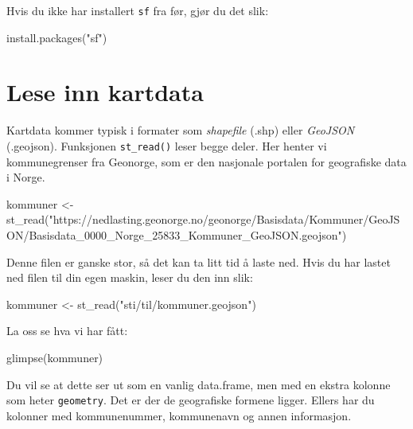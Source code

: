 \documentclass[
  norsk,
  letterpaper,
  DIV=11,
  numbers=noendperiod]{scrreprt}
\newenvironment{Shaded}{\begin{snugshade}}{\end{snugshade}}
\newcommand{\FunctionTok}[1]{\textcolor[rgb]{0.28,0.35,0.67}{#1}}
\newcommand{\NormalTok}[1]{\textcolor[rgb]{0.00,0.23,0.31}{#1}}
\newcommand{\OtherTok}[1]{\textcolor[rgb]{0.00,0.23,0.31}{#1}}
\newcommand{\StringTok}[1]{\textcolor[rgb]{0.13,0.47,0.30}{#1}}
\theoremstyle{definition}
\theoremstyle{remark}
\begin{document}
Hvis du ikke har installert \texttt{sf} fra før, gjør du det slik:

\begin{Shaded}
\begin{Highlighting}[]
\FunctionTok{install.packages}\NormalTok{(}\StringTok{"sf"}\NormalTok{)}
\end{Highlighting}
\end{Shaded}

\section{Lese inn kartdata}\label{lese-inn-kartdata}

Kartdata kommer typisk i formater som \emph{shapefile} (.shp) eller
\emph{GeoJSON} (.geojson). Funksjonen \texttt{st\_read()} leser begge
deler. Her henter vi kommunegrenser fra Geonorge, som er den nasjonale
portalen for geografiske data i Norge.

\begin{Shaded}
\begin{Highlighting}[]
\NormalTok{kommuner }\OtherTok{\textless{}{-}} \FunctionTok{st\_read}\NormalTok{(}\StringTok{"https://nedlasting.geonorge.no/geonorge/Basisdata/Kommuner/GeoJSON/Basisdata\_0000\_Norge\_25833\_Kommuner\_GeoJSON.geojson"}\NormalTok{)}
\end{Highlighting}
\end{Shaded}

Denne filen er ganske stor, så det kan ta litt tid å laste ned. Hvis du
har lastet ned filen til din egen maskin, leser du den inn slik:

\begin{Shaded}
\begin{Highlighting}[]
\NormalTok{kommuner }\OtherTok{\textless{}{-}} \FunctionTok{st\_read}\NormalTok{(}\StringTok{"sti/til/kommuner.geojson"}\NormalTok{)}
\end{Highlighting}
\end{Shaded}

La oss se hva vi har fått:

\begin{Shaded}
\begin{Highlighting}[]
\FunctionTok{glimpse}\NormalTok{(kommuner)}
\end{Highlighting}
\end{Shaded}

Du vil se at dette ser ut som en vanlig data.frame, men med en ekstra
kolonne som heter \texttt{geometry}. Det er der de geografiske formene
ligger. Ellers har du kolonner med kommunenummer, kommunenavn og annen
informasjon.
\end{document}
